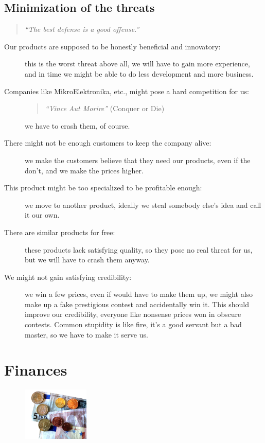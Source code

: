 \documentclass[a4paper,twoside,15pt]{book}
\begin{document}
		\subsection{Minimization of the threats}
			\begin{quote}
				\textit{``The best defense is a good offense.''}
			\end{quote}
			 \begin{description}
				\item[Our products are supposed to be honestly beneficial and innovatory:]
					this is the worst threat above all, we will have to gain more experience, and in time we might be able to do less development and more business.
				\item[Companies like MikroElektronika, etc., might pose a hard competition for us:]
					\begin{quote}
						\textit{``Vince Aut Morire''} \small{(Conquer or Die)}
					\end{quote}
					we have to crash them, of course.
				\item[There might not be enough customers to keep the company alive:]
					we make the customers believe that they need our products, even if the don't, and we make the prices higher.
				\item[This product might be too specialized to be profitable enough:]
					we move to another product, ideally we steal somebody else's idea and call it our own.
				\item[There are similar products for free:]
					these products lack satisfying quality, so they pose no real threat for us, but we will have to crash them anyway.
				\item[We might not gain satisfying credibility:]
					we win a few prices, even if would have to make them up, we might also make up a fake prestigious contest and accidentally win it. This should improve our credibility, everyone like nonsense prices won in obscure contests. Common stupidity is like fire, it's a good servant but a bad master, so we have to make it serve us.
			 \end{description}

	\section{Finances}
		\begin{figure}
			\centering{}
			\includegraphics[width=90pt]{images/Euromoenterogsedler.jpg}
		\end{figure}
\end{document}
